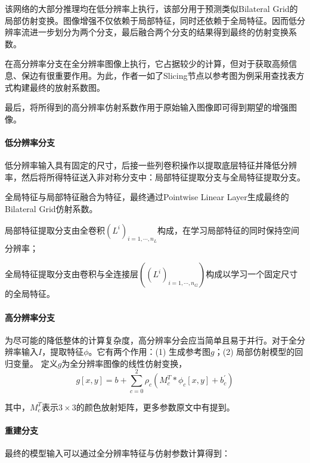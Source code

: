 \documentclass[letterpaper,12pt]{article}
\begin{document}
		该网络的大部分推理均在低分辨率上执行，该部分用于预测类似Bilateral Grid的局部仿射变换。图像增强不仅依赖于局部特征，同时还依赖于全局特征。因而低分辨率流进一步划分为两个分支，最后融合两个分支的结果得到最终的仿射变换系数。
		
		在高分辨率分支在全分辨率图像上执行，它占据较少的计算，但对于获取高频信息、保边有很重要作用。为此，作者一如了Slicing节点以参考图为例采用查找表方式构建最终的放射系数图。
		
		最后，将所得到的高分辨率仿射系数作用于原始输入图像即可得到期望的增强图像。
		
		\paragraph{低分辨率分支} \qquad
		
		低分辨率输入具有固定的尺寸，后接一些列卷积操作以提取底层特征并降低分辨率，然后将所得特征送入非对称分支中：局部特征提取分支与全局特征提取分支。
		
		全局特征与局部特征融合为特征，最终通过Pointwise Linear Layer生成最终的Bilateral Grid仿射系数。
		
			局部特征提取分支由全卷积$\left(L^i\right)_{i=1,\cdots,n_L}$构成，在学习局部特征的同时保持空间分辨率；
		
			全局特征提取分支由卷积与全连接层$(\left(L^i\right)_{i=1,\cdots,n_G})$构成以学习一个固定尺寸的全局特征。
		
		\paragraph{高分辨率分支} \qquad
				
		为尽可能的降低整体的计算复杂度，高分辨率分会应当简单且易于并行。对于全分辨率输入$I$，提取特征$\phi$。它有两个作用：(1) 生成参考图$g$；(2) 局部仿射模型的回归变量。
		定义$g$为全分辨率图像的线性仿射变换，
		\begin{equation}\label{eq:Linear affine transformation } %
			g\left[x,y\right]=b+\sum_{c=0}^{2}{\rho_c\left(M_c^T\ast\phi_c\left[x,y\right]+b_c^\prime\right)}
		\end{equation}
		
		其中，$M_c^T$表示$3\times3$的颜色放射矩阵，更多参数原文中有提到。
		
		\paragraph{重建分支} \qquad
		
		最终的模型输入可以通过全分辨率特征与仿射参数计算得到：
		
\end{document}
